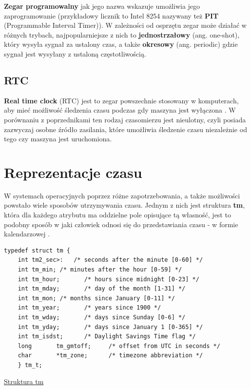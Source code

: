 \documentclass[shortabstract]{iithesis}
\theoremstyle{definition} \newtheorem*{definition}{Definicja}
\theoremstyle{definition} \newtheorem*{example}{Przykład}
\theoremstyle{definition} \newtheorem*{remark}{Uwaga}
\newenvironment{longlisting}{\captionsetup{type=listing}}{}
\begin{document}
\textbf{Zegar programowalny} jak jego nazwa wskazuje umożliwia jego zaprogramowanie (przykładowy licznik to Intel 8254 nazywany też \textbf{PIT} (Programmable Interval Timer)). W zależności od osprzętu zegar może działać w różnych trybach, najpopularniejsze z nich to \textbf{jednostrzałowy} (ang. one-shot), który wysyła sygnał za ustalony czas, a także \textbf{okresowy} (ang. periodic) gdzie sygnał jest wysyłany z ustaloną częstotliwością. 

\subsection{RTC}
\textbf{Real time clock} (RTC) jest to zegar powszechnie stosowany w komputerach, aby mieć możliwość śledzenia czasu podczas gdy maszyna jest wyłączona \cite{bib:lkd}. W porównaniu z poprzednikami ten rodzaj czasomierzu jest nieulotny, czyli posiada zazwyczaj osobne źródło zasilania, które umożliwia śledzenie czasu niezależnie od tego czy maszyna jest uruchomiona.

\section{Reprezentacje czasu}
W systemach operacyjnych poprzez różne zapotrzebowania, a także możliwości powstało wiele sposobów utrzymywania czasu. Jednym z nich jest struktura \textbf{tm}, która dla każdego atrybutu ma oddzielne pole opisujące tą własność, jest to podobny sposób w jaki człowiek odnosi się do przedstawiania czasu - w formie kalendarzowej \cite{bib:tm_t}.

\begin{longlisting}
  \begin{verbatim}
typedef struct tm {
	int	tm2_sec>:	/* seconds after the minute [0-60] */
	int	tm_min;	/* minutes after the hour [0-59] */
	int	tm_hour;       /* hours since midnight [0-23] */
	int	tm_mday;       /* day of the month [1-31] */
	int	tm_mon;	/* months since January [0-11] */
	int	tm_year;       /* years since 1900 */
	int	tm_wday;       /* days since Sunday [0-6] */
	int	tm_yday;       /* days since January 1 [0-365] */
	int	tm_isdst;      /* Daylight Savings Time flag */
	long       tm_gmtoff;     /* offset from UTC in seconds */
	char       *tm_zone;      /* timezone abbreviation */
    } tm_t;
  \end{verbatim}
  \caption{\href{https://mimiker.ii.uni.wroc.pl/source/xref/mimiker/include/sys/time.h?r=9505a819\#8}{Struktura tm}}
  \label{lst:structtm}
\end{longlisting}
\end{document}
